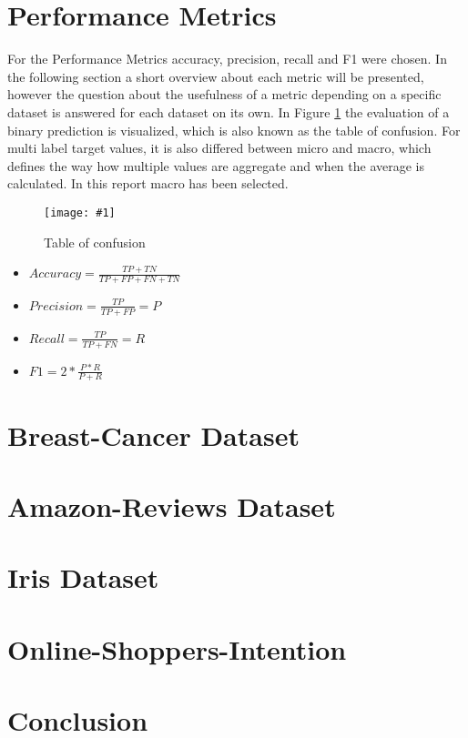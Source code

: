\documentclass{article}
\newcommand{\size}{0.8\textwidth}
\newcommand{\image}[3]{
\begin{figure}
\begin{center}
\texttt{[image: \#1]}
\caption{#2}
#3
\end{center}
\end{figure}
}
\begin{document}
\section{Performance Metrics}
For the Performance Metrics accuracy, precision, recall and F1 were chosen. In the following section a short overview about each metric will be presented, however the question about the usefulness of a metric depending on a specific dataset is answered for each dataset on its own. In Figure \ref{fig:conf} the evaluation of a binary prediction is visualized, which is also known as the table of confusion. For multi label target values, it is also differed between micro and macro, which defines the way how multiple values are aggregate and when the average is calculated. In this report macro has been selected.

\image{performance.png}{Table of confusion}{\label{fig:conf}}
\begin{itemize}
\item $Accuracy = \frac{TP + TN}{TP + FP + FN + TN}$

\item $Precision = \frac{TP}{TP+FP} = P$

\item $Recall = \frac{TP}{TP+FN} = R$

\item $F1=2*\frac{P*R}{P+R}$
\end{itemize}

\section{Breast-Cancer Dataset}


\section{Amazon-Reviews Dataset}


\section{Iris Dataset}


\section{Online-Shoppers-Intention}


\section{Conclusion}
\end{document}
